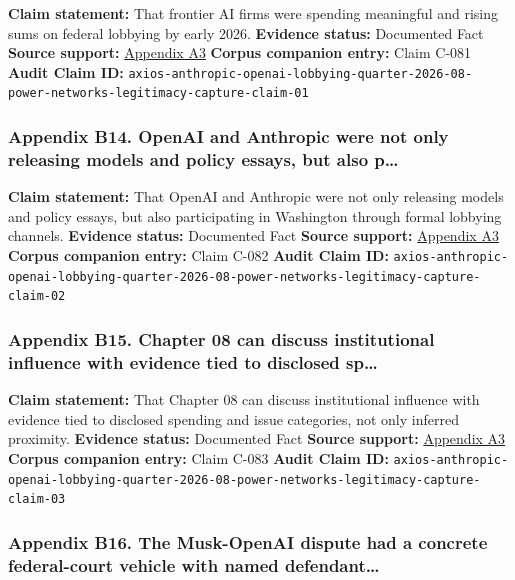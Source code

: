 \documentclass[
  american,
  11pt,
  letterpaper,
]{article}
\begin{document}
\textbf{Claim statement:} That frontier AI firms were spending
meaningful and rising sums on federal lobbying by early 2026.
\textbf{Evidence status:} Documented Fact \textbf{Source support:}
\hyperref[appendix-a3-anthropic-outspends-openai-in-biggest-ever-lobbying-quarter]{Appendix
A3} \textbf{Corpus companion entry:} Claim C-081 \textbf{Audit Claim
ID:}
\texttt{axios-anthropic-openai-lobbying-quarter-2026-08-power-networks-legitimacy-capture-claim-01}

\subsubsection{Appendix B14. OpenAI and Anthropic were not only
releasing models and policy essays, but also
p\ldots{}}\label{appendix-b14-openai-and-anthropic-were-not-only-releasing-models-and-policy-essays-but-also-p}

\textbf{Claim statement:} That OpenAI and Anthropic were not only
releasing models and policy essays, but also participating in Washington
through formal lobbying channels. \textbf{Evidence status:} Documented
Fact \textbf{Source support:}
\hyperref[appendix-a3-anthropic-outspends-openai-in-biggest-ever-lobbying-quarter]{Appendix
A3} \textbf{Corpus companion entry:} Claim C-082 \textbf{Audit Claim
ID:}
\texttt{axios-anthropic-openai-lobbying-quarter-2026-08-power-networks-legitimacy-capture-claim-02}

\subsubsection{Appendix B15. Chapter 08 can discuss institutional
influence with evidence tied to disclosed
sp\ldots{}}\label{appendix-b15-chapter-08-can-discuss-institutional-influence-with-evidence-tied-to-disclosed-sp}

\textbf{Claim statement:} That Chapter 08 can discuss institutional
influence with evidence tied to disclosed spending and issue categories,
not only inferred proximity. \textbf{Evidence status:} Documented Fact
\textbf{Source support:}
\hyperref[appendix-a3-anthropic-outspends-openai-in-biggest-ever-lobbying-quarter]{Appendix
A3} \textbf{Corpus companion entry:} Claim C-083 \textbf{Audit Claim
ID:}
\texttt{axios-anthropic-openai-lobbying-quarter-2026-08-power-networks-legitimacy-capture-claim-03}

\subsubsection{Appendix B16. The Musk-OpenAI dispute had a concrete
federal-court vehicle with named
defendant\ldots{}}\label{appendix-b16-the-musk-openai-dispute-had-a-concrete-federal-court-vehicle-with-named-defendant}
\end{document}
